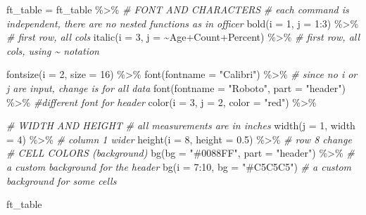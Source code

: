 \documentclass[
]{book}
\newenvironment{Shaded}{\begin{snugshade}}{\end{snugshade}}
\newcommand{\AttributeTok}[1]{\textcolor[rgb]{0.77,0.63,0.00}{#1}}
\newcommand{\CommentTok}[1]{\textcolor[rgb]{0.56,0.35,0.01}{\textit{#1}}}
\newcommand{\DecValTok}[1]{\textcolor[rgb]{0.00,0.00,0.81}{#1}}
\newcommand{\FloatTok}[1]{\textcolor[rgb]{0.00,0.00,0.81}{#1}}
\newcommand{\FunctionTok}[1]{\textcolor[rgb]{0.00,0.00,0.00}{#1}}
\newcommand{\NormalTok}[1]{#1}
\newcommand{\OtherTok}[1]{\textcolor[rgb]{0.56,0.35,0.01}{#1}}
\newcommand{\SpecialCharTok}[1]{\textcolor[rgb]{0.00,0.00,0.00}{#1}}
\newcommand{\StringTok}[1]{\textcolor[rgb]{0.31,0.60,0.02}{#1}}
\begin{document}
\begin{Shaded}
\begin{Highlighting}[]
\NormalTok{ft\_table }\OtherTok{=}\NormalTok{ ft\_table }\SpecialCharTok{\%\textgreater{}\%} 
\CommentTok{\# FONT AND CHARACTERS}
\CommentTok{\# each command is independent, there are no nested functions as in officer}
\FunctionTok{bold}\NormalTok{(}\AttributeTok{i =} \DecValTok{1}\NormalTok{, }\AttributeTok{j =} \DecValTok{1}\SpecialCharTok{:}\DecValTok{3}\NormalTok{) }\SpecialCharTok{\%\textgreater{}\%} \CommentTok{\# first row, all cols}
  \FunctionTok{italic}\NormalTok{(}\AttributeTok{i =} \DecValTok{3}\NormalTok{, }\AttributeTok{j =} \SpecialCharTok{\textasciitilde{}}\NormalTok{Age}\SpecialCharTok{+}\NormalTok{Count}\SpecialCharTok{+}\NormalTok{Percent) }\SpecialCharTok{\%\textgreater{}\%} \CommentTok{\# first row, all cols, using \textasciitilde{} notation}
  
  \FunctionTok{fontsize}\NormalTok{(}\AttributeTok{i =} \DecValTok{2}\NormalTok{, }\AttributeTok{size =} \DecValTok{16}\NormalTok{) }\SpecialCharTok{\%\textgreater{}\%}
  \FunctionTok{font}\NormalTok{(}\AttributeTok{fontname =} \StringTok{"Calibri"}\NormalTok{) }\SpecialCharTok{\%\textgreater{}\%} \CommentTok{\# since no i or j are input, change is for all data}
  \FunctionTok{font}\NormalTok{(}\AttributeTok{fontname =} \StringTok{"Roboto"}\NormalTok{, }\AttributeTok{part =} \StringTok{"header"}\NormalTok{) }\SpecialCharTok{\%\textgreater{}\%} \CommentTok{\#different font for header}
  \FunctionTok{color}\NormalTok{(}\AttributeTok{i =} \DecValTok{3}\NormalTok{, }\AttributeTok{j =} \DecValTok{2}\NormalTok{, }\AttributeTok{color =} \StringTok{"red"}\NormalTok{) }\SpecialCharTok{\%\textgreater{}\%}
  
  \CommentTok{\# WIDTH AND HEIGHT}
  \CommentTok{\# all measurements are in inches}
  \FunctionTok{width}\NormalTok{(}\AttributeTok{j =} \DecValTok{1}\NormalTok{, }\AttributeTok{width =} \DecValTok{4}\NormalTok{) }\SpecialCharTok{\%\textgreater{}\%} \CommentTok{\# column 1 wider}
  \FunctionTok{height}\NormalTok{(}\AttributeTok{i =} \DecValTok{8}\NormalTok{, }\AttributeTok{height =} \FloatTok{0.5}\NormalTok{) }\SpecialCharTok{\%\textgreater{}\%} \CommentTok{\# row 8 change}
  \CommentTok{\# CELL COLORS (background) }
  \FunctionTok{bg}\NormalTok{(}\AttributeTok{bg =} \StringTok{"\#0088FF"}\NormalTok{, }\AttributeTok{part =} \StringTok{"header"}\NormalTok{) }\SpecialCharTok{\%\textgreater{}\%} \CommentTok{\# a custom background for the header}
  \FunctionTok{bg}\NormalTok{(}\AttributeTok{i =} \DecValTok{7}\SpecialCharTok{:}\DecValTok{10}\NormalTok{, }\AttributeTok{bg =} \StringTok{"\#C5C5C5"}\NormalTok{) }\CommentTok{\# a custom background for some cells}

\NormalTok{ft\_table}
\end{Highlighting}
\end{Shaded}
\end{document}
